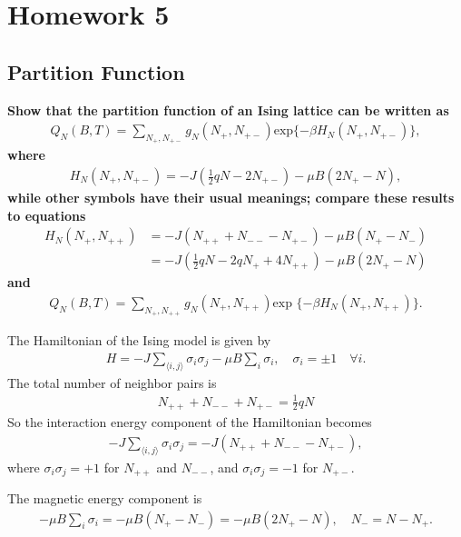\documentclass[../../main.tex]{subfiles}
\begin{document}
\section{Homework 5}
\subsection{Partition Function}
\textbf{Show that the partition function of an Ising lattice can be written as
  \begin{align*}
    Q_{N}(B,T) = \sum_{N_{+},N_{+-}} g_{N}(N_{+},N_{+-}) \text{exp}\{-\beta H_{N}(N_{+},N_{+-})\},
  \end{align*}
  where
  \begin{align}
    H_{N}(N_{+},N_{+-}) = -J \left(\frac{1}{2}qN - 2N_{+-}\right) - \mu B(2N_{+}-N),\label{eq:1}
  \end{align}
  while other symbols have their usual meanings; compare these results to equations 
  \begin{align}
    H_{N}(N_{+},N_{++}) &= -J(N_{++}+N_{--}-N_{+-})-\mu B(N_{+}-N_{-})\\
    &= -J\left(\frac{1}{2}qN - 2qN_{+} + 4N_{++}\right) - \mu B(2N_{+}-N)\label{eq:2}
  \end{align} and 
  \begin{align*}
    Q_{N}(B,T) = \sum_{N_{+},N_{++}}g_{N}(N_{+},N_{++})\text{exp }\{-\beta H_{N}(N_{+},N_{++})\}.
  \end{align*}}

  The Hamiltonian of the Ising model is given by
  \begin{align*}
    H = -J\sum_{\langle i,j\rangle}\sigma_{i}\sigma_{j}- \mu B\sum_{i}\sigma_{i},\quad \sigma_{i} = \pm 1 \quad\forall i.
  \end{align*}
  The total number of neighbor pairs is 
  \begin{align*}
    N_{++} + N_{--} + N_{+-} = \frac{1}{2}qN
  \end{align*}
  So the interaction energy component of the Hamiltonian becomes 
  \begin{align*}
    -J\sum_{\langle i,j\rangle}\sigma_{i}\sigma_{j} = -J(N_{++}+N_{--}-N_{+-}),
  \end{align*}
  where $\sigma_{i}\sigma_{j} = +1$ for $N_{++}$ and $N_{--}$, and $\sigma_{i}\sigma_{j} = -1$ for $N_{+-}$. 

  The magnetic energy component is 
\begin{align*}
  -\mu B\sum_{i}\sigma_{i} = -\mu B(N_{+}-N_{-}) = -\mu B(2N_{+}-N),\quad N_{-} = N - N_{+}. 
\end{align*}
\end{document}
